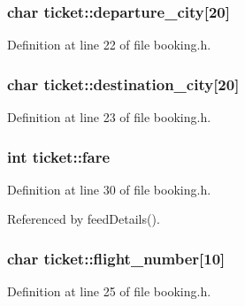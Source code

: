 \hypertarget{structticket_a1d6b301226a292359356534054313067}{
\subsubsection[{departure\+\_\+city}]{\setlength{\rightskip}{0pt plus 5cm}char ticket\+::departure\+\_\+city\mbox{[}20\mbox{]}}}\label{structticket_a1d6b301226a292359356534054313067}


Definition at line 22 of file booking.\+h.

\hypertarget{structticket_a1dc9ea1dcc21a6c198a5d040ccea89ff}{
\subsubsection[{destination\+\_\+city}]{\setlength{\rightskip}{0pt plus 5cm}char ticket\+::destination\+\_\+city\mbox{[}20\mbox{]}}}\label{structticket_a1dc9ea1dcc21a6c198a5d040ccea89ff}


Definition at line 23 of file booking.\+h.

\hypertarget{structticket_af79afaf9c850bee6ec68f883d359c068}{
\subsubsection[{fare}]{\setlength{\rightskip}{0pt plus 5cm}int ticket\+::fare}}\label{structticket_af79afaf9c850bee6ec68f883d359c068}


Definition at line 30 of file booking.\+h.



Referenced by feed\+Details().

\hypertarget{structticket_ab8bdf6615eae3d233291ab4be030df2a}{
\subsubsection[{flight\+\_\+number}]{\setlength{\rightskip}{0pt plus 5cm}char ticket\+::flight\+\_\+number\mbox{[}10\mbox{]}}}\label{structticket_ab8bdf6615eae3d233291ab4be030df2a}


Definition at line 25 of file booking.\+h.

